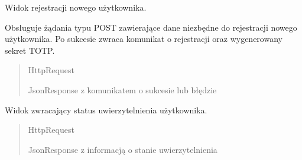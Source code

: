 \documentclass[letterpaper,10pt,polish]{sphinxmanual}
\begin{document}

\begin{fulllineitems}
\label{\detokenize{mainApp:mainApp.views.register_view}}
\pysigstartsignatures
{}
\pysigstopsignatures
\sphinxAtStartPar
Widok rejestracji nowego użytkownika.

\sphinxAtStartPar
Obsługuje żądania typu POST zawierające dane niezbędne do rejestracji nowego użytkownika.
Po sukcesie zwraca komunikat o rejestracji oraz wygenerowany sekret TOTP.
\begin{quote}\begin{description}
\sphinxAtStartPar
{} \textendash{} HttpRequest

\sphinxAtStartPar
JsonResponse z komunikatem o sukcesie lub błędzie

\end{description}\end{quote}

\end{fulllineitems}


\begin{fulllineitems}
\label{\detokenize{mainApp:mainApp.views.status}}
\pysigstartsignatures
{}
\pysigstopsignatures
\sphinxAtStartPar
Widok zwracający status uwierzytelnienia użytkownika.
\begin{quote}\begin{description}
\sphinxAtStartPar
{} \textendash{} HttpRequest

\sphinxAtStartPar
JsonResponse z informacją o stanie uwierzytelnienia

\end{description}\end{quote}

\end{fulllineitems}

\end{document}
